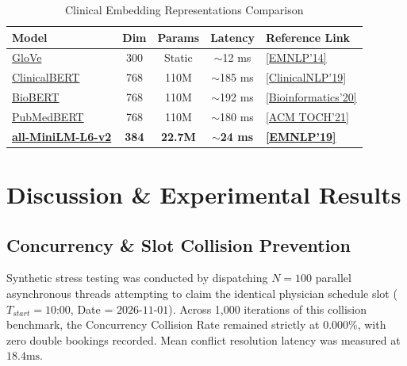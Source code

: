 \documentclass[conference]{IEEEtran}
\begin{document}
\begin{table}[htbp]
\centering
\caption{Clinical Embedding Representations Comparison}
\label{tab:embedding_comparison}
\begin{tabularx}{\columnwidth}{@{}l c c c p{2.1cm}@{}}
\toprule
\textbf{Model} & \textbf{Dim} & \textbf{Params} & \textbf{Latency} & \textbf{Reference Link} \\ \midrule
\href{https://doi.org/10.3115/v1/D14-1162}{GloVe} \cite{pennington2014glove} & 300 & Static & $\sim$12 ms & \href{https://doi.org/10.3115/v1/D14-1162}{[EMNLP'14]} \\
\href{https://doi.org/10.18653/v1/W19-1909}{ClinicalBERT} \cite{alsentzer2019publicly} & 768 & 110M & $\sim$185 ms & \href{https://doi.org/10.18653/v1/W19-1909}{[ClinicalNLP'19]} \\
\href{https://doi.org/10.1093/bioinformatics/btz682}{BioBERT} \cite{lee2020biobert} & 768 & 110M & $\sim$192 ms & \href{https://doi.org/10.1093/bioinformatics/btz682}{[Bioinformatics'20]} \\
\href{https://doi.org/10.1145/3458754}{PubMedBERT} \cite{gu2021domain} & 768 & 110M & $\sim$180 ms & \href{https://doi.org/10.1145/3458754}{[ACM TOCH'21]} \\
\textbf{\href{https://doi.org/10.18653/v1/D19-1410}{all-MiniLM-L6-v2}} \cite{reimers2019sentence} & \textbf{384} & \textbf{22.7M} & \textbf{$\sim$24 ms} & \href{https://doi.org/10.18653/v1/D19-1410}{\textbf{[EMNLP'19]}} \\ \bottomrule
\end{tabularx}
\end{table}

\section{Discussion \& Experimental Results}

\subsection{Concurrency \& Slot Collision Prevention}
Synthetic stress testing was conducted by dispatching $N = 100$ parallel asynchronous threads attempting to claim the identical physician schedule slot ($T_{start} = \text{10:00}$, Date = $\text{2026-11-01}$). Across 1,000 iterations of this collision benchmark, the Concurrency Collision Rate remained strictly at 0.000\%, with zero double bookings recorded. Mean conflict resolution latency was measured at $18.4\text{ms}$.
\end{document}
